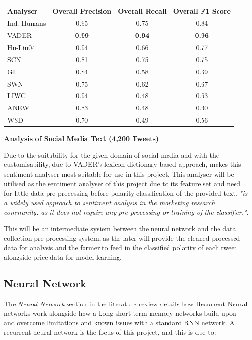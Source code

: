 \documentclass[oneside, 12pt]{article}
\begin{document}
		\begin{center}
			\begin{tabular}{l|c|c|c}
				\textbf{Analyser} & \textbf{Overall Precision} & \textbf{Overall Recall} & \textbf{Overall F1 Score}\\
				\hline
				\multirow{1}{*}{Ind. Humans} & 0.95 & 0.75 & 0.84 \\
				\multirow{1}{*}{VADER} & \textbf{0.99} & \textbf{0.94} & \textbf{0.96} \\
				\multirow{1}{*}{Hu-Liu04} & 0.94 & 0.66 & 0.77 \\
				\multirow{1}{*}{SCN} & 0.81 & 0.75 & 0.75 \\
				\multirow{1}{*}{GI} & 0.84 & 0.58 & 0.69 \\
				\multirow{1}{*}{SWN} & 0.75 & 0.62 & 0.67 \\
				\multirow{1}{*}{LIWC} & 0.94 & 0.48 & 0.63 \\
				\multirow{1}{*}{ANEW} & 0.83 & 0.48 & 0.60 \\
				\multirow{1}{*}{WSD} & 0.70 & 0.49 & 0.56 \\
			\end{tabular}
		
				\textbf{Analysis of Social Media Text (4,200 Tweets)}\cite{12}
		\end{center}
		
		Due to the suitability for the given domain of social media and with the customisability, due to VADER's lexicon-dictionary based approach, makes this sentiment analyser most suitable for use in this project. This analyser will be utilised as the sentiment analyser of this project due to its feature set and need for little data pre-processing before polarity classification of the provided text. \cite{11} \textit{"is a widely used approach to sentiment analysis in the marketing research community, as it does not require any pre-processing or training of the classifier."}.
		
		This will be an intermediate system between the neural network and the data collection pre-processing system, as the later will provide the cleaned processed data for analysis and the former to feed in the classified polarity of each tweet alongside price data for model learning.
		
		\subsection{Neural Network}
		The \textit{Neural Network} section in the literature review details how Recurrent Neural networks work alongside how a Long-short term memory networks build upon and overcome limitations and known issues with a standard RNN network. A recurrent neural network is the focus of this project, and this is due to:
		
\end{document}
